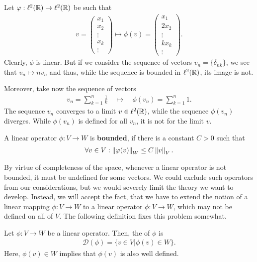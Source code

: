 \begin{example}
  Let $\varphi:\ell^2(\mathbb R)\to\ell^2(\mathbb R)$ be such that
  \begin{gather*}
    v =
    \begin{pmatrix}
      x_1 \\ x_2 \\ \vdots \\ x_k \\ \vdots
    \end{pmatrix}
    \mapsto \phi(v) =
    \begin{pmatrix}
      x_1 \\ 2x_2 \\ \vdots \\ kx_k \\ \vdots
    \end{pmatrix}.
  \end{gather*}
  Clearly, $\phi$ is linear. But if we consider the sequence of
  vectors $v_n = \{\delta_{nk}\}$, we see that $v_n \mapsto n v_n$ and
  thus, while the sequence is bounded in $\ell^2(\mathbb R)$, its image is
  not.
  
  Moreover, take now the sequence of vectors
  \begin{gather*}
    v_n = \sum_{k=1}^n \frac1k
    \quad \mapsto \quad \phi(v_n) = \sum_{k=1}^n 1.
  \end{gather*}
  The sequence $v_n$ converges to a limit $v \in \ell^2(\mathbb R)$, while
  the sequence $\phi(v_n)$ diverges. While $\phi(v_n)$ is defined for
  all $v_n$, it is not for the limit $v$.
\end{example}

\begin{definition}
  A linear operator $\phi: V\to W$ is \textbf{bounded}, if there is a constant
  $C > 0$ such that
  \begin{gather*}
    \forall v\in V: \left\|\varphi(v)\right\|_W \le C \left\|v\vphantom{()}\right\|_V.
  \end{gather*}
\end{definition}

\begin{remark}
  By virtue of completeness of the space, whenever a linear operator
  is not bounded, it must be undefined for some vectors. We could
  exclude such operators from our considerations, but we would
  severely limit the theory we want to develop. Instead, we will
  accept the fact, that we have to extend the notion of a linear
  mapping $\phi: V\to W$ to a linear operator $\phi: V\to W$, which
  may not be defined on all of $V$. The following definition fixes
  this problem somewhat.
\end{remark}

\begin{definition}
  Let $\phi: V\to W$ be a linear operator. Then, the 
  of $\phi$ is
  \begin{gather*}
    \mathcal D(\phi) = \bigl\{ v\in V \big|
    \phi(v) \in W \bigr\}.
  \end{gather*}
  Here, $\phi(v) \in W$ implies that $\phi(v)$ is also well defined.
\end{definition}



